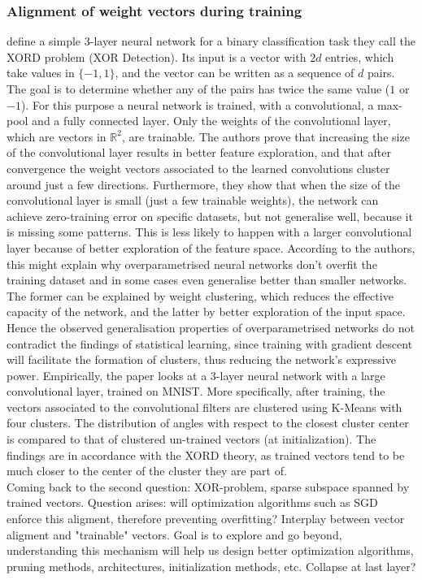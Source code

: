 \subsubsection*{Alignment of weight vectors during training}
\cite{brutzkus2019larger} define a simple 3-layer neural network for a binary classification task they call the XORD problem (XOR Detection). Its input is a vector with $2d$ entries, which take values in $\{-1, 1\}$, and the vector can be written as a sequence of $d$ pairs. The goal is to determine whether any of the pairs has twice the same value ($1$ or $-1$). For this purpose a neural network is trained, with a convolutional, a max-pool and a fully connected layer. Only the weights of the convolutional layer, which are vectors in $\mathbb{R}^2$, are trainable. The authors prove that increasing the size of the convolutional layer results in better feature exploration, and that after convergence the weight vectors associated to the learned convolutions cluster around just a few directions. Furthermore, they show that when the size of the convolutional layer is small (just a few trainable weights), the network can achieve zero-training error on specific datasets, but not generalise well, because it is missing some patterns. This is less likely to happen with a larger convolutional layer because of better exploration of the feature space. According to the authors, this might explain why overparametrised neural networks don't overfit the training dataset and in some cases even generalise better than smaller networks. The former can be explained by weight clustering, which reduces the effective capacity of the network, and the latter by better exploration of the input space. Hence the observed generalisation properties of overparametrised networks do not contradict the findings of statistical learning, since training with gradient descent will facilitate the formation of clusters, thus reducing the network's expressive power. Empirically, the paper looks at a 3-layer neural network with a large convolutional layer, trained on MNIST. More specifically, after training, the vectors associated to the convolutional filters are clustered using K-Means with four clusters. The distribution of angles with respect to the closest cluster center is compared to that of clustered un-trained vectors (at initialization). The findings are in accordance with the XORD theory, as trained vectors tend to be much closer to the center of the cluster they are part of.\\

Coming back to the second question: XOR-problem, sparse subspace spanned by trained vectors. Question arises: will optimization algorithms such as SGD enforce this aligment, therefore preventing overfitting? Interplay between vector aligment and "trainable" vectors. Goal is to explore and go beyond, understanding this mechanism will help us design better optimization algorithms, pruning methods, architectures, initialization methods, etc. Collapse at last layer?


